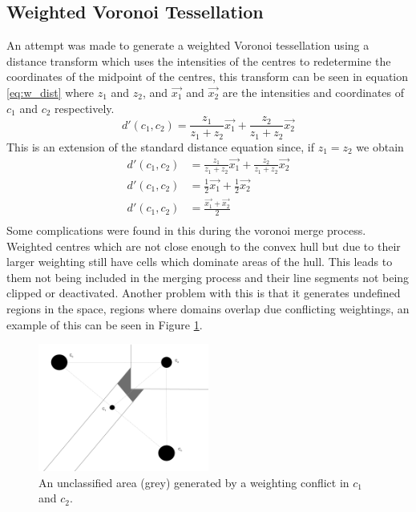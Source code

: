 \subsection{Weighted Voronoi Tessellation}
An attempt was made to generate a weighted Voronoi tessellation using a distance transform which uses the intensities of the centres to redetermine the coordinates of the midpoint of the centres, this transform can be seen in equation \ref{eq:w_dist} where $z_1$ and $z_2$, and $\vec{x_1}$ and $\vec{x_2}$ are the intensities and coordinates of $c_1$ and $c_2$ respectively.
\begin{equation}\label{eq:w_dist}
	d'(c_1,c_2) = \frac{z_1}{z_1+z_2}\vec{x_1} + \frac{z_2}{z_1+z_2}\vec{x_2}
\end{equation}
This is an extension of the standard distance equation since, if $z_1=z_2$ we obtain
\begin{align*}
	d'(c_1,c_2) &= \frac{z_1}{z_1+z_2}\vec{x_1} + \frac{z_2}{z_1+z_2}\vec{x_2} \\
	d'(c_1,c_2) &= \frac{1}{2}\vec{x_1} + \frac{1}{2}\vec{x_2} \\ 
	d'(c_1,c_2) &= \frac{\vec{x_1} + \vec{x_2}}{2} \\
\end{align*}
Some complications were found in this during the voronoi merge process. Weighted centres which are not close enough to the convex hull but due to their larger weighting still have cells which dominate areas of the hull. This leads to them not being included in the merging process and their line segments not being clipped or deactivated. Another problem with this is that it generates undefined regions in the space, regions where domains overlap due conflicting weightings, an example of this can be seen in Figure \ref{fig:w_voronoi_issue}.
\begin{figure}[H]
\includegraphics[width=0.5\textwidth]{Images/weighting_problem.png}
\centering
\caption{An unclassified area (grey) generated by a weighting conflict in $c_1$ and $c_2$.}
\label{fig:w_voronoi_issue}
\end{figure}
